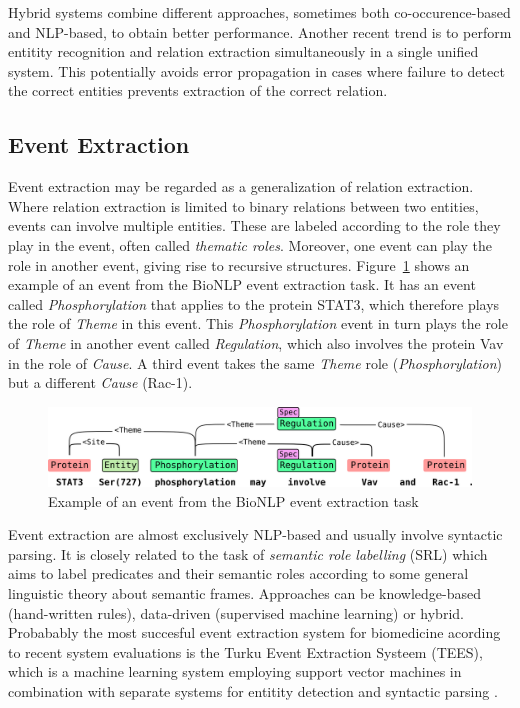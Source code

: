 Hybrid systems combine different approaches, sometimes both co-occurence-based and NLP-based, to obtain better performance.
Another recent trend is to perform entitity recognition and relation extraction simultaneously in a single unified system.
This potentially avoids error propagation in cases where failure to detect the correct entities prevents extraction of the correct relation.
  
\subsection{Event Extraction}

Event extraction may be regarded as a generalization of relation extraction.
Where relation extraction is limited to binary relations between two entities, events can involve multiple entities.
These are labeled according to the role they play in the event, often called \emph{thematic roles}.
Moreover, one event can play the role in another event, giving rise to recursive structures.
Figure~\ref{fig:event-example} shows an example of an event from the BioNLP event extraction task.
It has an event called \emph{Phosphorylation} that applies to the protein STAT3, which therefore plays the role of \emph{Theme} in this event.
This \emph{Phosphorylation} event in turn plays the role of \emph{Theme} in another event called \emph{Regulation}, which also involves the protein Vav in the role of \emph{Cause}.
A third event takes the same \emph{Theme} role (\emph{Phosphorylation}) but a different \emph{Cause} (Rac-1).

\begin{figure}
\begin{center}
\includegraphics[scale=0.65]{figures/event-example.png}
 \caption{Example of an event from the BioNLP event extraction task \citep{Bjorne2011EXTRACTING}}
\label{fig:event-example}
\end{center}
\end{figure}

Event extraction are almost exclusively NLP-based and usually involve syntactic parsing.
It is closely related to the task of \emph{semantic role labelling} (SRL) which aims to label predicates and their semantic roles according to some general linguistic theory about semantic frames. 
Approaches can be knowledge-based (hand-written rules), data-driven (supervised machine learning) or hybrid.
Probabably the most succesful event extraction system for biomedicine acording to recent system evaluations is the Turku Event Extraction Systeem (TEES), which is a machine learning system employing support vector machines in combination with separate systems for entitity detection and syntactic parsing \citep{Bjorne2011EXTRACTING}. 

